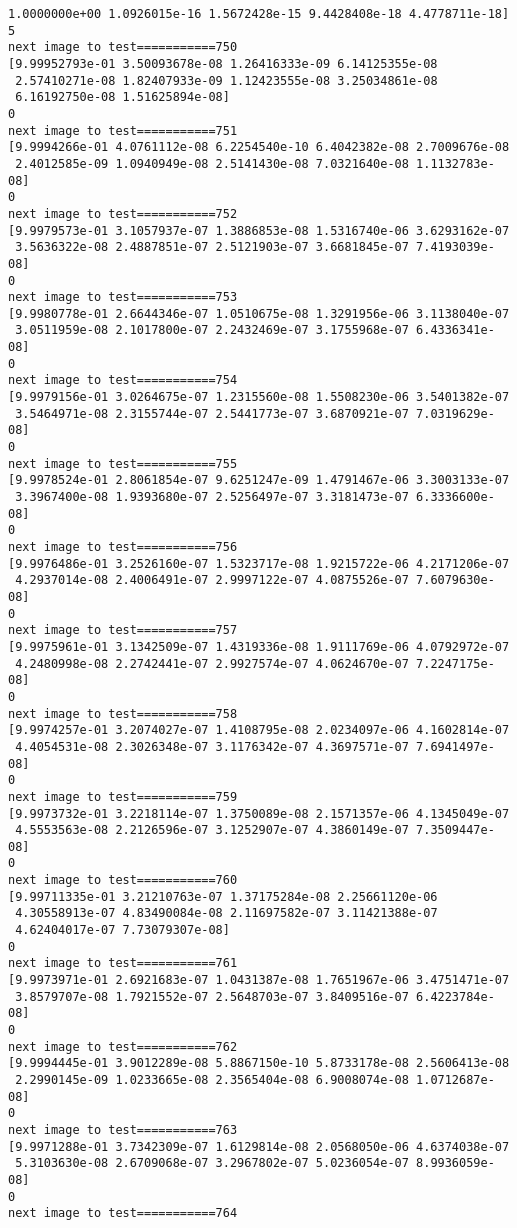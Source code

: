 \documentclass[11pt]{article}
\begin{document}
\begin{Verbatim}[commandchars=\\\{\}]
 1.0000000e+00 1.0926015e-16 1.5672428e-15 9.4428408e-18 4.4778711e-18]
5
next image to test===========750
[9.99952793e-01 3.50093678e-08 1.26416333e-09 6.14125355e-08
 2.57410271e-08 1.82407933e-09 1.12423555e-08 3.25034861e-08
 6.16192750e-08 1.51625894e-08]
0
next image to test===========751
[9.9994266e-01 4.0761112e-08 6.2254540e-10 6.4042382e-08 2.7009676e-08
 2.4012585e-09 1.0940949e-08 2.5141430e-08 7.0321640e-08 1.1132783e-08]
0
next image to test===========752
[9.9979573e-01 3.1057937e-07 1.3886853e-08 1.5316740e-06 3.6293162e-07
 3.5636322e-08 2.4887851e-07 2.5121903e-07 3.6681845e-07 7.4193039e-08]
0
next image to test===========753
[9.9980778e-01 2.6644346e-07 1.0510675e-08 1.3291956e-06 3.1138040e-07
 3.0511959e-08 2.1017800e-07 2.2432469e-07 3.1755968e-07 6.4336341e-08]
0
next image to test===========754
[9.9979156e-01 3.0264675e-07 1.2315560e-08 1.5508230e-06 3.5401382e-07
 3.5464971e-08 2.3155744e-07 2.5441773e-07 3.6870921e-07 7.0319629e-08]
0
next image to test===========755
[9.9978524e-01 2.8061854e-07 9.6251247e-09 1.4791467e-06 3.3003133e-07
 3.3967400e-08 1.9393680e-07 2.5256497e-07 3.3181473e-07 6.3336600e-08]
0
next image to test===========756
[9.9976486e-01 3.2526160e-07 1.5323717e-08 1.9215722e-06 4.2171206e-07
 4.2937014e-08 2.4006491e-07 2.9997122e-07 4.0875526e-07 7.6079630e-08]
0
next image to test===========757
[9.9975961e-01 3.1342509e-07 1.4319336e-08 1.9111769e-06 4.0792972e-07
 4.2480998e-08 2.2742441e-07 2.9927574e-07 4.0624670e-07 7.2247175e-08]
0
next image to test===========758
[9.9974257e-01 3.2074027e-07 1.4108795e-08 2.0234097e-06 4.1602814e-07
 4.4054531e-08 2.3026348e-07 3.1176342e-07 4.3697571e-07 7.6941497e-08]
0
next image to test===========759
[9.9973732e-01 3.2218114e-07 1.3750089e-08 2.1571357e-06 4.1345049e-07
 4.5553563e-08 2.2126596e-07 3.1252907e-07 4.3860149e-07 7.3509447e-08]
0
next image to test===========760
[9.99711335e-01 3.21210763e-07 1.37175284e-08 2.25661120e-06
 4.30558913e-07 4.83490084e-08 2.11697582e-07 3.11421388e-07
 4.62404017e-07 7.73079307e-08]
0
next image to test===========761
[9.9973971e-01 2.6921683e-07 1.0431387e-08 1.7651967e-06 3.4751471e-07
 3.8579707e-08 1.7921552e-07 2.5648703e-07 3.8409516e-07 6.4223784e-08]
0
next image to test===========762
[9.9994445e-01 3.9012289e-08 5.8867150e-10 5.8733178e-08 2.5606413e-08
 2.2990145e-09 1.0233665e-08 2.3565404e-08 6.9008074e-08 1.0712687e-08]
0
next image to test===========763
[9.9971288e-01 3.7342309e-07 1.6129814e-08 2.0568050e-06 4.6374038e-07
 5.3103630e-08 2.6709068e-07 3.2967802e-07 5.0236054e-07 8.9936059e-08]
0
next image to test===========764

\end{Verbatim}
\end{document}
